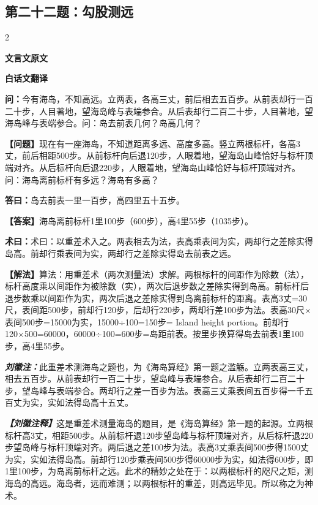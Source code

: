 \documentclass[10pt,a4paper]{article}
\newcommand{\wen}[1]{\textbf{\color{problemcolor}问：}#1\par}
\newcommand{\da}[1]{\textbf{答曰：}#1\par}
\newcommand{\shu}[1]{\textbf{术曰：}#1\par}
\newcommand{\liuhui}[1]{{\color{commentarycolor}\textit{\textbf{刘徽注：}}#1\par}}
\newcommand{\classicalheader}[1]{{\centering\large\bfseries\color{classicalcolor} #1\par\vspace{0.5em}}}
\newcommand{\wenmodern}[1]{\textbf{\color{moderncolor}【问题】}#1\par}
\newcommand{\damodern}[1]{\textbf{【答案】}#1\par}
\newcommand{\shumodern}[1]{\textbf{【解法】}#1\par}
\newcommand{\liuhuimodern}[1]{{\color{commentarycolor}\textit{\textbf{【刘徽注释】}}#1\par}}
\newcommand{\modernheader}[1]{{\centering\large\bfseries\color{moderncolor} #1\par\vspace{0.5em}}}
\newcommand{\problemsec}[1]{\subsection*{#1}}
\begin{document}
\problemsec{第二十二题：勾股测远}
\begin{paracol}{2}
\classicalheader{文言文原文}
\switchcolumn
\modernheader{白话文翻译}
\switchcolumn*

\wen{今有海岛，不知高远。立两表，各高三丈，前后相去五百步。从前表却行一百二十步，人目著地，望海岛峰与表端参合。从后表却行二百二十步，人目著地，望海岛峰与表端参合。问：岛去前表几何？岛高几何？}

\switchcolumn

\wenmodern{现在有一座海岛，不知道距离多远、高度多高。竖立两根标杆，各高3丈，前后相距500步。从前标杆向后退120步，人眼着地，望海岛山峰恰好与标杆顶端对齐。从后标杆向后退220步，人眼着地，望海岛山峰恰好与标杆顶端对齐。问：海岛离前标杆有多远？海岛有多高？}

\switchcolumn*

\da{岛去前表一里一百步，高四里五十五步。}

\switchcolumn

\damodern{海岛离前标杆1里100步（600步），高4里55步（1035步）。}

\switchcolumn*

\shu{术曰：以重差术入之。两表相去为法，表高乘表间为实，两却行之差除实得岛高。前却行乘表间为实，两却行之差除实得岛去前表之远。}

\switchcolumn

\shumodern{算法：用重差术（两次测量法）求解。两根标杆的间距作为除数（法），标杆高度乘以间距作为被除数（实），两次后退步数之差除实得到岛高。前标杆后退步数乘以间距作为实，两次后退之差除实得到岛离前标杆的距离。表高3丈=30尺，表间距500步，前却行120步，后却行220步，两却行差100步为法。表高30尺×表间500步=15000为实，15000÷100=150步= Island height portion。前却行120×500=60000，60000÷100=600步=岛距前表。按里步换算得岛去前表1里100步，高4里55步。}

\switchcolumn*

\liuhui{此重差术测海岛之题也，为《海岛算经》第一题之滥觞。立两表高三丈，相去五百步。从前表却行一百二十步，望岛峰与表端参合。从后表却行二百二十步，望岛峰与表端参合。两却行之差一百步为法。表高三丈乘表间五百步得一千五百丈为实，实如法得岛高十五丈。}

\switchcolumn

\liuhuimodern{这是重差术测量海岛的题目，是《海岛算经》第一题的起源。立两根标杆高3丈，相距500步。从前标杆退120步望岛峰与标杆顶端对齐，从后标杆退220步望岛峰与标杆顶端对齐。两后退之差100步为法。表高3丈乘表间500步得1500丈为实，实如法得岛高。前却行120步乘表间500步得60000步为实，如法得600步，即1里100步，为岛离前标杆之远。此术的精妙之处在于：以两根标杆的咫尺之矩，测海岛的高远。海岛者，远而难测；以两根标杆的重差，则高远毕见。所以称之为神术。}

\end{paracol}
\end{document}
